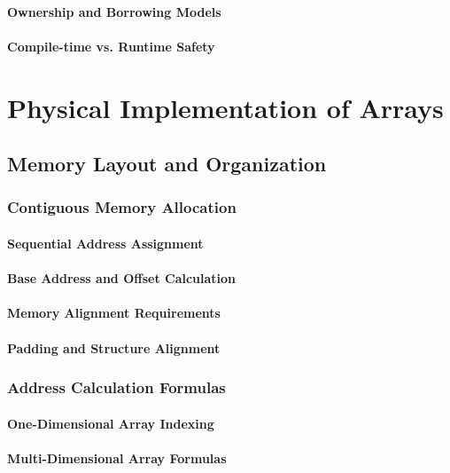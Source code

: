 \documentclass[12pt, oneside]{book}
\begin{document}
\subsubsection{Ownership and Borrowing Models}
\subsubsection{Compile-time vs. Runtime Safety}


\chapter{Physical Implementation of Arrays}

\section{Memory Layout and Organization}
\subsection{Contiguous Memory Allocation}
\subsubsection{Sequential Address Assignment}
\subsubsection{Base Address and Offset Calculation}
\subsubsection{Memory Alignment Requirements}
\subsubsection{Padding and Structure Alignment}

\subsection{Address Calculation Formulas}
\subsubsection{One-Dimensional Array Indexing}
\subsubsection{Multi-Dimensional Array Formulas}
\end{document}
